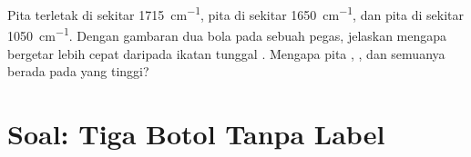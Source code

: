 \begin{exercise}[$\star\star\star$]\label{exo:g11:infrared:15}
Pita   terletak di sekitar \qty{1715}{cm^{-1}}, pita
 di sekitar \qty{1650}{cm^{-1}}, dan pita  di sekitar
\qty{1050}{cm^{-1}}. Dengan gambaran dua bola pada sebuah pegas,
jelaskan mengapa   bergetar lebih cepat
daripada ikatan tunggal . Mengapa pita , , dan
 semuanya berada pada  yang tinggi?
\end{exercise}

\section{Soal: Tiga Botol Tanpa Label}

